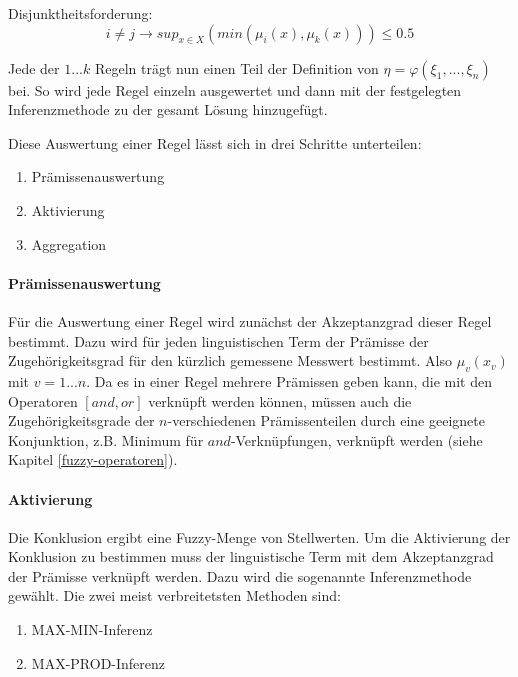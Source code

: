 \documentclass[12pt,a4paper,bibliography=totocnumbered,listof=totocnumbered, abstracton]{scrartcl}
\theoremstyle{Umgebung}
\begin{document}
\begin{defnt}
	Disjunktheitsforderung: 
	\begin{equation}
		i \neq j \rightarrow sup_{x \in X} (min(\mu_i(x), \mu_k(x))) \leq 0.5
	\end{equation}
\end{defnt}

Jede der $1...k$ Regeln trägt nun einen Teil der Definition von $\eta = \varphi(\xi_1,..., \xi_n)$ bei. So wird jede Regel einzeln ausgewertet und dann mit der festgelegten Inferenzmethode zu der gesamt Lösung hinzugefügt.

Diese Auswertung einer Regel lässt sich in drei Schritte unterteilen:

\begin{enumerate} 
	\item Prämissenauswertung
	\item Aktivierung
	\item Aggregation
\end{enumerate}

\paragraph{Prämissenauswertung}

Für die Auswertung einer Regel wird zunächst der Akzeptanzgrad dieser Regel bestimmt. Dazu wird für jeden linguistischen Term der Prämisse der Zugehörigkeitsgrad für den kürzlich gemessene Messwert bestimmt. Also $\mu_v (x_v)$ mit $v = 1...n$. Da es in einer Regel mehrere Prämissen geben kann, die mit den Operatoren $\left[and, or\right]$ verknüpft werden können, müssen auch die Zugehörigkeitsgrade der $n$-verschiedenen Prämissenteilen durch eine geeignete Konjunktion, z.B. Minimum für $and$-Verknüpfungen, verknüpft werden (siehe Kapitel \ref{fuzzy-operatoren}).

\paragraph{Aktivierung}

Die Konklusion ergibt eine Fuzzy-Menge von Stellwerten. Um die Aktivierung der Konklusion zu bestimmen muss der linguistische Term mit dem Akzeptanzgrad der Prämisse verknüpft werden. Dazu wird die sogenannte Inferenzmethode gewählt. Die zwei meist verbreitetsten Methoden sind: 

\begin{enumerate} 
	\item MAX-MIN-Inferenz
	\item MAX-PROD-Inferenz
\end{enumerate}
\end{document}

